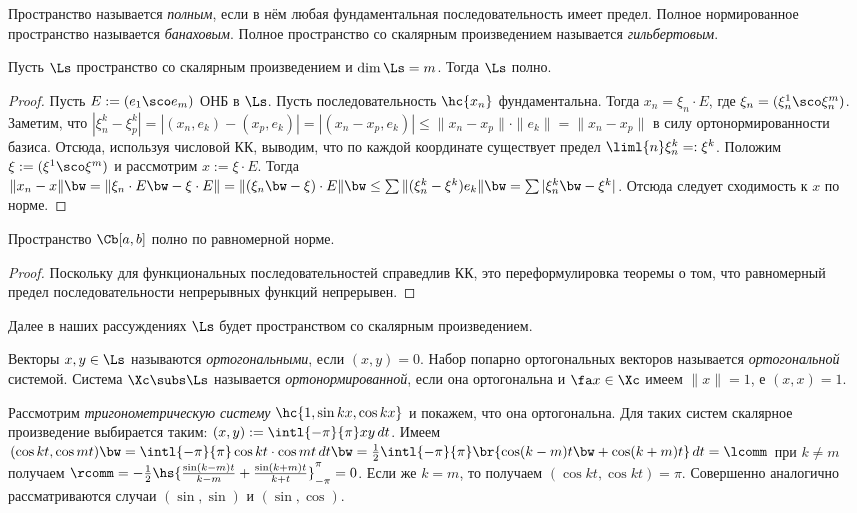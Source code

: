 \documentclass[a4paper]{article}
\newcommand{\intlpp}{\intl{-\pi}{\pi}}
\begin{document}
\begin{df}
Пространство называется \emph{полным}, если в нём любая фундаментальная последовательность имеет предел. Полное нормированное пространство
называется \emph{банаховым}. Полное пространство со скалярным произведением называется \emph{гильбертовым}.
\end{df}

\begin{theorem}
Пусть $\Ls$ пространство со скалярным произведением и $\dim \Ls = m$. Тогда $\Ls$ полно.
\end{theorem}
\begin{proof}
Пусть $E := (e_1\sco e_m)$ ОНБ в $\Ls$. Пусть последовательность $\hc{x_n}$
фундаментальна. Тогда $x_n = \xi_n \cdot E$, где $\xi_n = (\xi_n^1\sco\xi_n^m)$.
Заметим, что $|\xi_n^k-\xi_p^k| = |(x_n,e_k)-(x_p,e_k)|=|(x_n-x_p,e_k)|\le \|x_n-x_p\|\cdot\|e_k\|=\|x_n-x_p\|$
в силу ортонормированности базиса. Отсюда, используя числовой КК, выводим, что по
каждой координате существует предел $\liml{n} \xi^k_n =: \xi^k$.
Положим $\xi := (\xi^1\sco\xi^m)$ и рассмотрим $x := \xi \cdot E$. Тогда
$\|x_n - x\| \bw= \|\xi_n \cdot E \bw- \xi \cdot E\| = \|(\xi_n \bw- \xi)\cdot E \| \bw\le
\sum \|(\xi_n^k-\xi^k)e_k\| \bw= \sum |\xi_n^k \bw- \xi^k|$.
Отсюда следует сходимость к $x$ по норме.
\end{proof}

\begin{theorem}
Пространство $\Cb[a,b]$ полно по равномерной норме.
\end{theorem}
\begin{proof}
Поскольку для функциональных последовательностей справедлив КК, это
переформулировка теоремы о том, что равномерный
предел последовательности непрерывных функций непрерывен.
\end{proof}

Далее в наших рассуждениях $\Ls$ будет пространством со скалярным произведением.

Векторы $x, y \in \Ls$ называются \emph{ортогональными}, если $(x,y) = 0$. Набор попарно
ортогональных векторов называется \emph{ортогональной} системой. Система
$\Xc \subs \Ls$ называется \emph{ортонормированной}, если она ортогональна и
$\fa x \in \Xc$ имеем $\|x\| = 1$, е $(x,x)=1$.

Рассмотрим \emph{тригонометрическую систему} $\hc{1, \sin kx, \cos kx}$ и покажем, что она
ортогональна. Для таких систем скалярное произведение выбирается таким: $(x,y) := \intlpp x y \,dt$.
Имеем $(\cos kt, \cos mt) \bw= \intlpp \cos kt \cdot \cos mt \,dt \bw=
\frac{1}{2}\intlpp\br{\cos(k-m)t \bw+ \cos(k+m)t}\,dt= \lcomm$ при $k \neq m$ получаем $\rcomm =
-\frac{1}{2}\hs{\frac{\sin(k-m)t}{k-m}+\frac{\sin(k+m)t}{k+t}}_{-\pi}^{\pi} = 0$. Если же $k=m$, то
получаем $(\cos kt, \cos kt) = \pi$. Совершенно аналогично рассматриваются случаи $(\sin, \sin)$ и
$(\sin, \cos)$.
\end{document}

